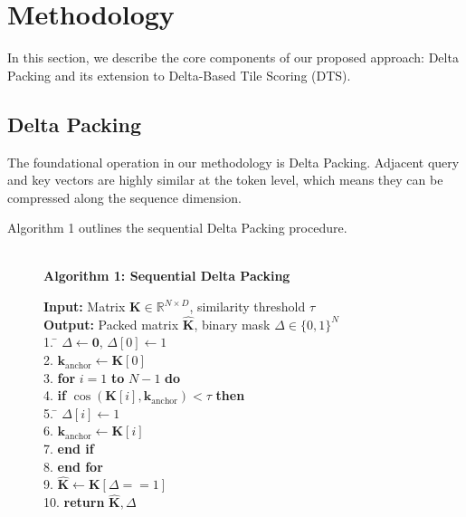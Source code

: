 \section{Methodology}

In this section, we describe the core components of our proposed approach: Delta Packing and its extension to Delta-Based Tile Scoring (DTS). 

\subsection{Delta Packing}
The foundational operation in our methodology is Delta Packing. Adjacent query and key vectors are highly similar at the token level, which means they can be compressed along the sequence dimension. 

Algorithm 1 outlines the sequential Delta Packing procedure.

\begin{figure}[htbp]
\noindent\hrulefill\\
\textbf{Algorithm 1: Sequential Delta Packing}\\[-2mm]
\noindent\hrulefill
\begin{tabbing}
\textbf{Input:} Matrix $\mathbf{K} \in \mathbb{R}^{N \times D}$, similarity threshold $\tau$ \\
\textbf{Output:} Packed matrix $\hat{\mathbf{K}}$, binary mask $\Delta \in \{0, 1\}^N$ \\
1. \quad \= $\Delta \gets \mathbf{0}$, $\Delta[0] \gets 1$ \\
2. \> $\mathbf{k}_{\text{anchor}} \gets \mathbf{K}[0]$ \\
3. \> \textbf{for} $i = 1$ \textbf{to} $N-1$ \textbf{do} \\
4. \> \quad \= \textbf{if} $\cos(\mathbf{K}[i], \mathbf{k}_{\text{anchor}}) < \tau$ \textbf{then} \\
5. \> \> \quad \= $\Delta[i] \gets 1$ \\
6. \> \> \> $\mathbf{k}_{\text{anchor}} \gets \mathbf{K}[i]$ \\
7. \> \> \textbf{end if} \\
8. \> \textbf{end for} \\
9. \> $\hat{\mathbf{K}} \gets \mathbf{K}[\Delta == 1]$ \\
10.\> \textbf{return} $\hat{\mathbf{K}}, \Delta$
\end{tabbing}
\vspace{-4mm}
\noindent\hrulefill
\end{figure}

